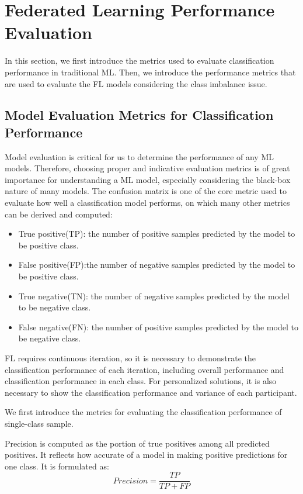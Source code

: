 \documentclass[10pt,journal,compsoc]{IEEEtran}
\begin{document}
\section{Federated Learning Performance Evaluation}
\label{sec:metric}
In this section, we first introduce the metrics used to evaluate classification performance in traditional ML. Then, we introduce the performance metrics that are used to evaluate the FL models considering the class imbalance issue. 
\vspace{-0.2cm}

\subsection{Model Evaluation Metrics for Classification Performance}
Model evaluation is critical for us to determine the performance of any ML models. Therefore, choosing proper and indicative evaluation metrics is of great importance for understanding a ML model, especially considering the black-box nature of many models. The confusion matrix is one of the core metric used to evaluate how well a classification model performs, on which many other metrics can be derived and computed: 
\vspace{-0.1cm}

\begin{itemize} 
\item True positive(TP): the number of positive samples predicted by the model to be positive class.
\item False positive(FP):the number of negative samples predicted by the model to be positive class.
\item True negative(TN): the number of negative samples predicted by the model to be negative class.
\item False negative(FN): the number of positive samples predicted by the model to be negative class.
\end{itemize}

FL requires continuous iteration, so it is necessary to demonstrate the classification performance of each iteration, including overall performance and classification performance in each class. For personalized solutions, it is also necessary to show the classification performance and variance of each participant.

We first introduce the metrics for evaluating the classification performance of single-class sample.

Precision is computed as the portion of true positives among all predicted positives. It reflects how accurate of a model in making positive predictions for one class. It is formulated as:
\vspace{-0.2cm}
\begin{equation}
Precision=\frac{TP}{TP + FP}
\end{equation}
\end{document}
